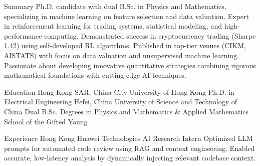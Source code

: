 \documentclass[caps, english]{financecv}
\begin{document}
\begin{cvsection}{Summary}
    Ph.D. candidate with dual B.Sc. in Physics and Mathematics, specializing in machine learning on feature selection and data valuation. Expert in reinforcement learning for trading systems, statistical modeling, and high-performance computing. Demonstrated success in cryptocurrency trading (Sharpe 1.42) using self-developed RL algorithms. Published in top-tier venues (CIKM, AISTATS) with focus on data valuation and unsupervised machine learning. Passionate about developing innovative quantitative strategies combining rigorous mathematical foundations with cutting-edge AI techniques.
\end{cvsection}

\begin{cvsection}{Education}
    {Hong Kong SAR, China}
    {City University of Hong Kong}
    {}
    {Ph.D. in Electrical Engineering}
    {}
    {}
    {}
    {Hefei, China}
    {University of Science and Technology of China}
    {}
    {Dual B.Sc. Degrees in Physics and Mathematics \& Applied Mathematics}
    {School of the Gifted Young}
    {}
    {}
\end{cvsection}

\begin{cvsection}{Experience}
    {Hong Kong}
    {Huawei Technologies}
    {AI Research Intern}
    {Optimized LLM prompts for automated code review using RAG and context engineering. Enabled accurate, low-latency analysis by dynamically injecting relevant codebase context.}
    {}
    {}
    {}
\end{cvsection}
\end{document}
